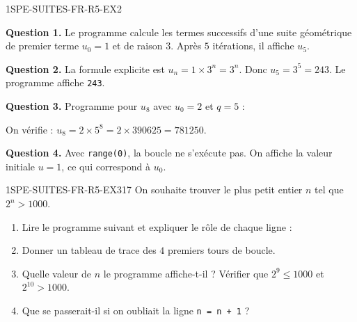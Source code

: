 \begin{corrige}{1SPE-SUITES-FR-R5-EX2}


\textbf{Question 1.} Le programme calcule les termes successifs d'une suite géométrique de premier terme $u_0 = 1$ et de raison $3$. Après $5$ itérations, il affiche $u_5$.

\textbf{Question 2.} La formule explicite est $u_n = 1 \times 3^n = 3^n$. Donc $u_5 = 3^5 = 243$. Le programme affiche \verb|243|.

\textbf{Question 3.} Programme pour $u_8$ avec $u_0 = 2$ et $q = 5$ :

\medskip


\medskip
On vérifie : $u_8 = 2 \times 5^8 = 2 \times 390625 = 781250$.


\textbf{Question 4.} Avec \verb|range(0)|, la boucle ne s'exécute pas. On affiche la valeur initiale $u = 1$, ce qui correspond à $u_0$.

\end{corrige}


\begin{exercice}{1SPE-SUITES-FR-R5-EX3}{1}{7}
On souhaite trouver le plus petit entier $n$ tel que $2^n > 1000$.

\begin{enumerate}
  \item Lire le programme suivant et expliquer le rôle de chaque ligne :

\medskip


  \item Donner un tableau de trace des $4$ premiers tours de boucle.
  \item Quelle valeur de $n$ le programme affiche-t-il ? Vérifier que $2^9 \leq 1000$ et $2^{10} > 1000$.
  \item Que se passerait-il si on oubliait la ligne \texttt{n = n + 1} ?
\end{enumerate}
\end{exercice}


